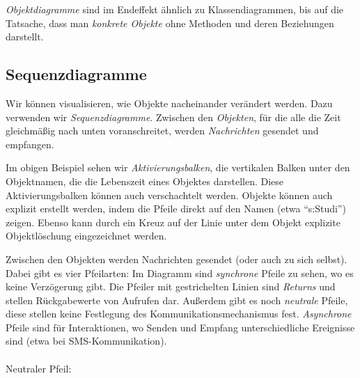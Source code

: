 \documentclass[german]{panikzettel}
\begin{document}
\emph{Objektdiagramme} sind im Endeffekt ähnlich zu Klassendiagrammen, bis auf die Tatsache, dass man \emph{konkrete Objekte} ohne Methoden und deren Beziehungen darstellt.

\subsection{Sequenzdiagramme}
\label{sec:sequenzdiagramme}

Wir können visualisieren, wie Objekte nacheinander verändert werden.
Dazu verwenden wir \emph{Sequenzdiagramme}.
Zwischen den \emph{Objekten}, für die alle die Zeit gleichmäßig nach unten voranschreitet, werden \emph{Nachrichten} gesendet und empfangen.


Im obigen Beispiel sehen wir \emph{Aktivierungsbalken}, die vertikalen Balken unter den Objektnamen, die die Lebenszeit eines Objektes darstellen.
Diese Aktivierungsbalken können auch verschachtelt werden.
Objekte können auch explizit erstellt werden, indem die Pfeile direkt auf den Namen (etwa ``s:Studi'') zeigen.
Ebenso kann durch ein Kreuz auf der Linie unter dem Objekt explizite Objektlöschung eingezeichnet werden.

Zwischen den Objekten werden Nachrichten gesendet (oder auch zu sich selbst).
Dabei gibt es vier Pfeilarten: Im Diagramm sind \emph{synchrone} Pfeile zu sehen, wo es keine Verzögerung gibt.
Die Pfeiler mit gestrichelten Linien sind \emph{Returns} und stellen Rückgabewerte von Aufrufen dar.
Außerdem gibt es noch \emph{neutrale} Pfeile, diese stellen keine Festlegung des Kommunikationsmechanismus fest.
\emph{Asynchrone} Pfeile sind für Interaktionen, wo Senden und Empfang unterschiedliche Ereignisse sind (etwa bei SMS-Kommunikation).
~\\~\\
Neutraler Pfeil: 
\end{document}
